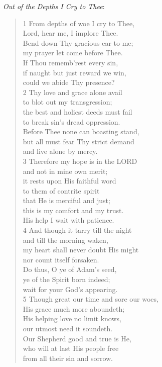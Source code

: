 \pagebreak

\textit{Out of the Depths I Cry to Thee}:

\begin{quote}

1 From depths of woe I cry to Thee,\\
Lord, hear me, I implore Thee.\\
Bend down Thy gracious ear to me;\\
my prayer let come before Thee.\\
If Thou rememb'rest every sin,\\
if naught but just reward we win,\\
could we abide Thy presence?\\

2 Thy love and grace alone avail\\
to blot out my transgression;\\
the best and holiest deeds must fail\\
to break sin's dread oppression.\\
Before Thee none can boasting stand,\\
but all must fear Thy strict demand\\
and live alone by mercy.\\

3 Therefore my hope is in the LORD\\
and not in mine own merit;\\
it rests upon His faithful word\\
to them of contrite spirit\\
that He is merciful and just;\\
this is my comfort and my trust.\\
His help I wait with patience.\\

4 And though it tarry till the night\\
and till the morning waken,\\
my heart shall never doubt His might\\
nor count itself forsaken.\\
Do thus, O ye of Adam's seed,\\
ye of the Spirit born indeed;\\
wait for your God's appearing.\\

5 Though great our time and sore our woes,\\
His grace much more aboundeth;\\
His helping love no limit knows,\\
our utmost need it soundeth.\\
Our Shepherd good and true is He,\\
who will at last His people free\\
from all their sin and sorrow.\\
\end{quote}

